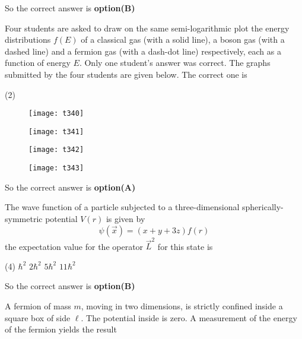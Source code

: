 \begin{questions}
\begin{answer}
	So the correct answer is \textbf{option(B)}
\end{answer}
\begin{minipage}{\textwidth}
	\question Four students are asked to draw on the same semi-logarithmic plot the energy distributions $f(E)$ of a classical gas (with a solid line), a boson gas (with a dashed line) and a fermion gas (with a dash-dot line) respectively, each as a function of energy $E .$ Only one student's answer was correct. The graphs submitted by the four students are given below. The correct one is
\end{minipage}
\begin{tasks}(2)
	\task[\textbf{A.}] \begin{figure}[H]
		\centering
		\texttt{[image: t340]}
	\end{figure}
	\task[\textbf{B.}] \begin{figure}[H]
		\centering
		\texttt{[image: t341]}
	\end{figure}
	\task[\textbf{C.}] \begin{figure}[H]
		\centering
		\texttt{[image: t342]}
	\end{figure}
	\task[\textbf{D.}] \begin{figure}[H]
		\centering
		\texttt{[image: t343]}
	\end{figure}
\end{tasks}
\begin{answer}
	So the correct answer is \textbf{option(A)}
\end{answer}
\begin{minipage}{\textwidth}
	\question The wave function of a particle subjected to a three-dimensional spherically-symmetric potential $V(r)$ is given by
	$$
	\psi(\vec{x})=(x+y+3 z) f(r)
	$$
	the expectation value for the operator $\vec{L}^{2}$ for this state is
\end{minipage}
\begin{tasks}(4)
	\task[\textbf{A.}]   $\hbar^{2}$
	\task[\textbf{B.}] $2 \hbar^{2}$
	\task[\textbf{C.}] $5 \hbar^{2}$
	\task[\textbf{D.}] $11 \hbar^{2}$
\end{tasks}
\begin{answer}
	So the correct answer is \textbf{option(B)}
\end{answer}
\begin{minipage}{\textwidth}
	\question A fermion of mass $m$, moving in two dimensions, is strictly confined inside a square box of side $\ell$. The potential inside is zero. A measurement of the energy of the fermion yields the result

\end{minipage}
\end{questions}
